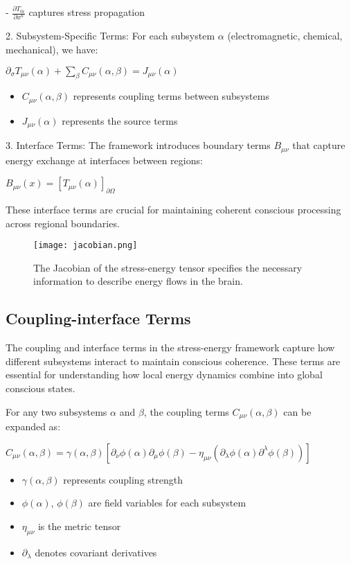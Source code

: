 - $\frac{\partial T_{0i}}{\partial x^k}$ captures stress propagation

2. Subsystem-Specific Terms:
For each subsystem $\alpha$ (electromagnetic, chemical, mechanical), we have:

$\partial_\sigma T_{\mu\nu}(\alpha) + \sum_\beta C_{\mu\nu}(\alpha,\beta) = J_{\mu\nu}(\alpha)$

\begin{itemize}
\item $C_{\mu\nu}(\alpha,\beta)$ represents coupling terms between subsystems
\item $J_{\mu\nu}(\alpha)$ represents the source terms
\end{itemize}

3. Interface Terms:
The framework introduces boundary terms $B_{\mu\nu}$ that capture energy exchange at interfaces between regions:

$B_{\mu\nu}(x) = [T_{\mu\nu}(\alpha)]_{\partial\Omega}$

These interface terms are crucial for maintaining coherent conscious processing across regional boundaries.

\begin{figure}[h]
    \centering
    \texttt{[image: jacobian.png]}

    \caption{The Jacobian of the stress-energy tensor specifies the necessary information to describe energy flows in the brain.}
\end{figure}

\subsection{Coupling-interface Terms}

The coupling and interface terms in the stress-energy framework capture how different subsystems interact to maintain conscious coherence. These terms are essential for understanding how local energy dynamics combine into global conscious states.

For any two subsystems $\alpha$ and $\beta$, the coupling terms $C_{\mu\nu}(\alpha,\beta)$ can be expanded as:

$C_{\mu\nu}(\alpha,\beta) = \gamma(\alpha,\beta)[\partial_\nu\phi(\alpha)\partial_\mu\phi(\beta) - \eta_{\mu\nu}(\partial_\lambda\phi(\alpha)\partial^\lambda\phi(\beta))]$

\begin{itemize}
\item $\gamma(\alpha,\beta)$ represents coupling strength
\item $\phi(\alpha)$, $\phi(\beta)$ are field variables for each subsystem
\item $\eta_{\mu\nu}$ is the metric tensor
\item $\partial_\lambda$ denotes covariant derivatives
\end{itemize}


